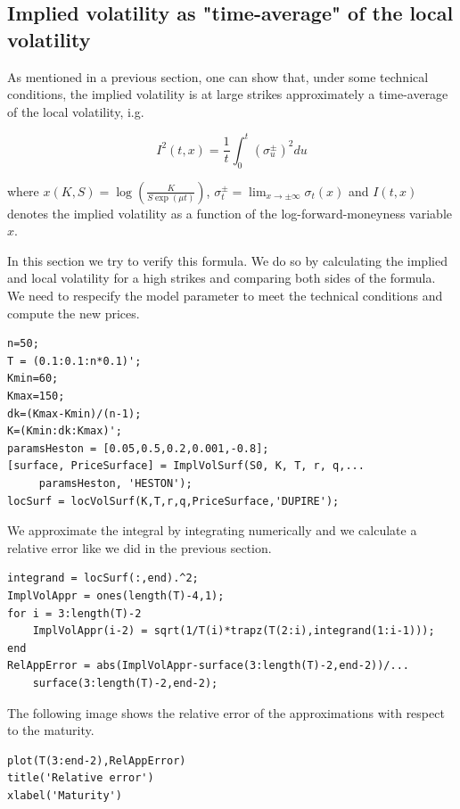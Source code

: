\subsection{Implied volatility as "time-average" of the local volatility}

\begin{par}
As mentioned in a previous section, one can show that, under some technical conditions, the implied volatility is at large strikes approximately a time-average of the local volatility, i.g.
\end{par} \vspace{1em}
\begin{par}
$$I^2(t,x)=\frac{1}{t} \int_0^t (\sigma_u^\pm )^2du$$
\end{par} \vspace{1em}
\begin{par}
where $x(K,S) = \log\left(\frac{K}{S\exp\left(\mu t\right)}\right)$, $\sigma_t^\pm=\lim_{x\to\pm\infty}\sigma_t(x)$ and $I(t,x)$ denotes the implied volatility as a function of the log-forward-moneyness variable $x$.
\end{par} \vspace{1em}
\begin{par}
In this section we try to verify this formula. We do so by calculating the implied and local volatility for a high strikes and comparing both sides of the formula. We need to respecify the model parameter to meet the technical conditions and compute the new prices.
\end{par} \vspace{1em}
\begin{verbatim}
n=50;
T = (0.1:0.1:n*0.1)';
Kmin=60;
Kmax=150;
dk=(Kmax-Kmin)/(n-1);
K=(Kmin:dk:Kmax)';
paramsHeston = [0.05,0.5,0.2,0.001,-0.8];
[surface, PriceSurface] = ImplVolSurf(S0, K, T, r, q,...
	 paramsHeston, 'HESTON');
locSurf = locVolSurf(K,T,r,q,PriceSurface,'DUPIRE');
\end{verbatim}
\begin{par}
We approximate the integral by integrating numerically and we calculate a relative error like we did in the previous section.
\end{par} \vspace{1em}
\begin{verbatim}
integrand = locSurf(:,end).^2;
ImplVolAppr = ones(length(T)-4,1);
for i = 3:length(T)-2
    ImplVolAppr(i-2) = sqrt(1/T(i)*trapz(T(2:i),integrand(1:i-1)));
end
RelAppError = abs(ImplVolAppr-surface(3:length(T)-2,end-2))/...
	surface(3:length(T)-2,end-2);
\end{verbatim}
\begin{par}
The following image shows the relative error of the approximations with respect to the maturity.
\end{par} \vspace{1em}
\begin{verbatim}
plot(T(3:end-2),RelAppError)
title('Relative error')
xlabel('Maturity')
\end{verbatim}

